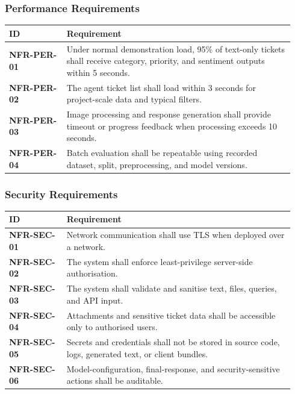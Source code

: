\documentclass[10pt,letterpaper]{article}
\newcommand{\req}[1]{\textbf{#1}}
\newenvironment{requirements}{%
  \small\setlength{\tabcolsep}{4pt}%
  \begin{longtable}{|L{0.19\linewidth}|L{0.75\linewidth}|}
  \hline\textbf{ID} & \textbf{Requirement}\\\hline\endhead}{\hline\end{longtable}}
\newenvironment{templatebody}{\par\justifying\setlength{\emergencystretch}{3em}}{\par}
\begin{document}
\begin{templatebody}
\subsubsection{Performance Requirements}
\begin{requirements}
\req{NFR-PER-01} & Under normal demonstration load, 95\% of text-only tickets shall receive category, priority, and sentiment outputs within 5 seconds.\\
\req{NFR-PER-02} & The agent ticket list shall load within 3 seconds for project-scale data and typical filters.\\
\req{NFR-PER-03} & Image processing and response generation shall provide timeout or progress feedback when processing exceeds 10 seconds.\\
\req{NFR-PER-04} & Batch evaluation shall be repeatable using recorded dataset, split, preprocessing, and model versions.\\
\end{requirements}

\subsubsection{Security Requirements}
\begin{requirements}
\req{NFR-SEC-01} & Network communication shall use TLS when deployed over a network.\\
\req{NFR-SEC-02} & The system shall enforce least-privilege server-side authorisation.\\
\req{NFR-SEC-03} & The system shall validate and sanitise text, files, queries, and API input.\\
\req{NFR-SEC-04} & Attachments and sensitive ticket data shall be accessible only to authorised users.\\
\req{NFR-SEC-05} & Secrets and credentials shall not be stored in source code, logs, generated text, or client bundles.\\
\req{NFR-SEC-06} & Model-configuration, final-response, and security-sensitive actions shall be auditable.\\
\end{requirements}


\end{templatebody}
\end{document}
